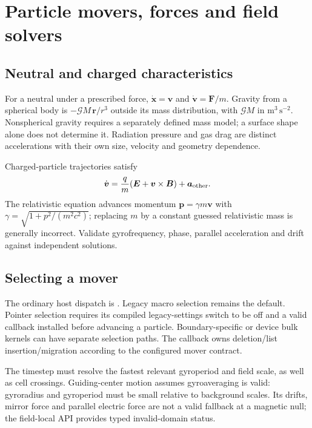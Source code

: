 \chapter{Particle movers, forces and field solvers}\label{ch:movers}
\section{Neutral and charged characteristics}
For a neutral under a prescribed force,
$\dot{\boldsymbol x}=\boldsymbol v$ and
$\dot{\boldsymbol v}=\boldsymbol F/m$.
Gravity from a spherical body is
$-\mathcal GM\,\boldsymbol r/r^3$ outside its mass distribution, with
$\mathcal GM$ in $\mathrm{m^3\,s^{-2}}$. Nonspherical gravity requires a
separately defined mass model; a surface shape alone does not determine it.
Radiation pressure and gas drag are distinct accelerations with their own
size, velocity and geometry dependence.

Charged-particle trajectories satisfy
\begin{equation}
\dot{\boldsymbol v}=\frac{q}{m}
(\boldsymbol E+\boldsymbol v\times\boldsymbol B)+\boldsymbol a_{\rm other}.
\end{equation}
The relativistic equation advances momentum
$\boldsymbol p=\gamma m\boldsymbol v$ with
$\gamma=\sqrt{1+p^2/(m^2c^2)}$; replacing $m$ by a constant guessed
relativistic mass is generally incorrect. Validate gyrofrequency, phase,
parallel acceleration and drift against independent solutions.

\section{Selecting a mover}
The ordinary host dispatch is
.
Legacy macro selection remains the default. Pointer selection requires its
compiled legacy-settings switch to be off and a valid
 callback installed before
advancing a particle. Boundary-specific or device bulk kernels can have
separate selection paths. The callback owns deletion/list insertion/migration
according to the configured mover contract.

The timestep must resolve the fastest relevant gyroperiod and field scale,
as well as cell crossings. Guiding-center motion assumes gyroaveraging is
valid: gyroradius and gyroperiod must be small relative to background scales.
Its drifts, mirror force and parallel electric force are not a valid fallback
at a magnetic null; the field-local API provides typed invalid-domain status.

